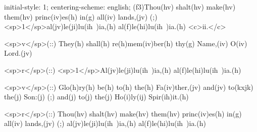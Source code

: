 initial-style: 1;
centering-scheme: english;
(f3)Thou(hv) shalt(hv) make(hv) them(hv) princ(iv)es(h) in(g) all(iv) lands,(jv) (;) <sp>1</sp>al(jv)le(ji)lu(ih~)ia,(h) al(f)le(hi)lu(ih~)ia.(h) <c>ii.</c>

<sp>v</sp>(::) They(h) shall(h) re(h)mem(iv)ber(h) thy(g) Name,(iv) O(iv) Lord.(jv)

<sp>r</sp>(::) <sp>1</sp>Al(jv)le(ji)lu(ih~)ia,(h) al(f)le(hi)lu(ih~)ia.(h)

<sp>v</sp>(::) Glo(h)ry(h) be(h) to(h) the(h) Fa(iv)ther,(jv) and(jv) to(kxjk) the(j) Son:(j) (;) and(j) to(j) the(j) Ho(i)ly(ij) Spir(ih)it.(h)

<sp>r</sp>(::) Thou(hv) shalt(hv) make(hv) them(hv) princ(iv)es(h) in(g) all(iv) lands,(jv) (;) al(jv)le(ji)lu(ih~)ia,(h) al(f)le(hi)lu(ih~)ia.(h)